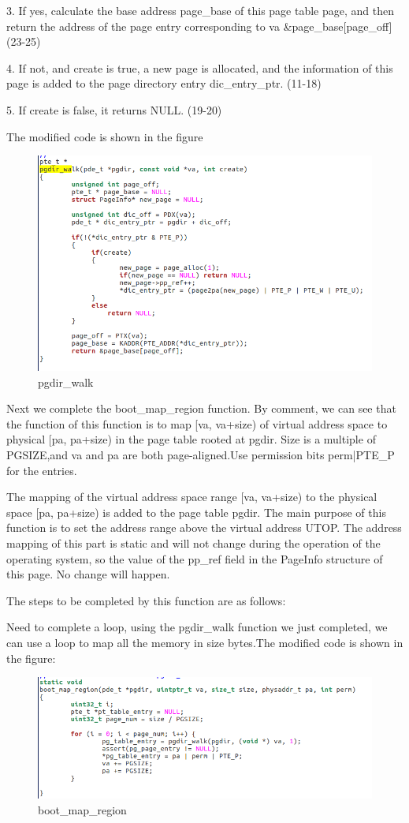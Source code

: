 3. If yes, calculate the base address page\_base of this page table page, and then return the address of the page entry corresponding to va \&page\_base[page\_off] (23-25)

4. If not, and create is true, a new page is allocated, and the information of this page is added to the page directory entry dic\_entry\_ptr. (11-18)

5. If create is false, it returns NULL. (19-20)

The modified code is shown in the figure
\begin{figure}[H]
\centering
\includegraphics[width=0.8\linewidth]{figure/pgdir_walk_changed}
\caption{pgdir\_walk}
\end{figure}

Next we complete the boot\_map\_region function. By comment, we can see that the function of this function is to map [va, va+size) of virtual address space to physical [pa, pa+size) in the page table rooted at pgdir.  Size is a multiple of PGSIZE,and va and pa are both page-aligned.Use permission bits perm|PTE\_P for the entries.


The mapping of the virtual address space range [va, va+size) to the physical space [pa, pa+size) is added to the page table pgdir. The main purpose of this function is to set the address range above the virtual address UTOP. The address mapping of this part is static and will not change during the operation of the operating system, so the value of the pp\_ref field in the PageInfo structure of this page. No change will happen.

The steps to be completed by this function are as follows:

Need to complete a loop, using the pgdir\_walk function we just completed, we can use a loop to map all the memory in size bytes.The modified code is shown in the figure:
\begin{figure}[H]
\centering
\includegraphics[width=0.8\linewidth]{figure/boot_map_region_changed}
\caption{boot\_map\_region}
\end{figure}


